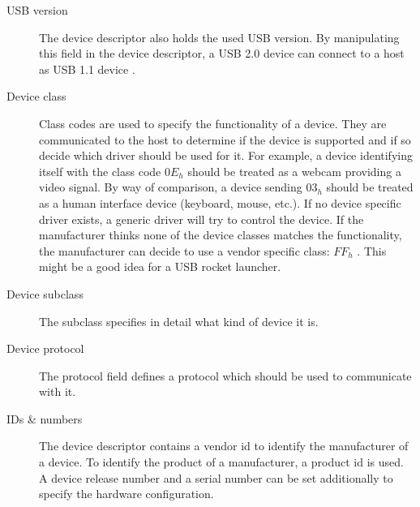 \documentclass{acm_proc_article-sp}
\begin{document}
\begin{description}
\item[USB version]
The device descriptor also holds the used USB version.
By manipulating this field in the device descriptor, a USB 2.0 device can connect to a host as USB 1.1 device \cite{beyond}.

\item[Device class]
Class codes are used to specify the functionality of a device.
They are communicated to the host to determine if the device is supported and if so decide which driver should be used for it.
For example, a device identifying itself with the class code $0E_h$ should be treated as a webcam providing a video signal.
By way of comparison, a device sending $03_h$ should be treated as a human interface device (keyboard, mouse, etc.).
If no device specific driver exists, a generic driver will try to control the device.
If the manufacturer thinks none of the device classes matches the functionality, the manufacturer can decide to use a
vendor specific class: $FF_h$ \cite{axel}.
This might be a good idea for a USB rocket launcher.

\item[Device subclass]
The subclass specifies in detail what kind of device it is.

\item[Device protocol]
The protocol field defines a protocol which should be used to communicate with it.

\item [IDs \& numbers]
The device descriptor contains a vendor id to identify the manufacturer of a device.
To identify the product of a manufacturer, a product id is used.
A device release number and a serial number can be set additionally to specify the
hardware configuration.

\end{description}
\end{document}
